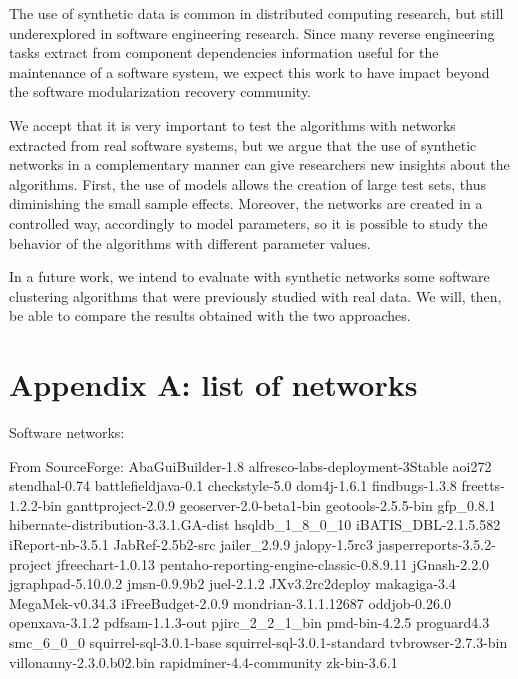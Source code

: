 The use of synthetic data is common in distributed computing research, but still
underexplored in software engineering research. Since many reverse engineering
tasks extract from component dependencies information useful for the maintenance
of a software system, we expect this work to have impact beyond the software
modularization recovery community.


We accept that it is very important to test the algorithms with networks
extracted from real software systems, but we argue that the use of synthetic
networks in a complementary manner can give researchers new insights about the
algorithms. First, the use of models allows the creation of large test sets,
thus diminishing the small sample effects. Moreover, the networks are created in
a controlled way, accordingly to model parameters, so it is possible to study
the behavior of the algorithms with different parameter values.

In a future work, we intend to evaluate with synthetic networks some software
clustering algorithms that were previously studied with real data. We will,
then, be able to compare the results obtained with the two approaches.

\section{Appendix A: list of networks}

Software networks:

From SourceForge:
AbaGuiBuilder-1.8
alfresco-labs-deployment-3Stable
aoi272
stendhal-0.74
battlefieldjava-0.1
checkstyle-5.0
dom4j-1.6.1
findbugs-1.3.8
freetts-1.2.2-bin
ganttproject-2.0.9
geoserver-2.0-beta1-bin
geotools-2.5.5-bin
gfp\_0.8.1
hibernate-distribution-3.3.1.GA-dist
hsqldb\_1\_8\_0\_10
iBATIS\_DBL-2.1.5.582
iReport-nb-3.5.1
JabRef-2.5b2-src
jailer\_2.9.9
jalopy-1.5rc3
jasperreports-3.5.2-project
jfreechart-1.0.13
pentaho-reporting-engine-classic-0.8.9.11
jGnash-2.2.0
jgraphpad-5.10.0.2
jmsn-0.9.9b2
juel-2.1.2
JXv3.2rc2deploy
makagiga-3.4
MegaMek-v0.34.3
iFreeBudget-2.0.9
mondrian-3.1.1.12687
oddjob-0.26.0
openxava-3.1.2
pdfsam-1.1.3-out
pjirc\_2\_2\_1\_bin
pmd-bin-4.2.5
proguard4.3
smc\_6\_0\_0
squirrel-sql-3.0.1-base
squirrel-sql-3.0.1-standard
tvbrowser-2.7.3-bin
villonanny-2.3.0.b02.bin
rapidminer-4.4-community
zk-bin-3.6.1

